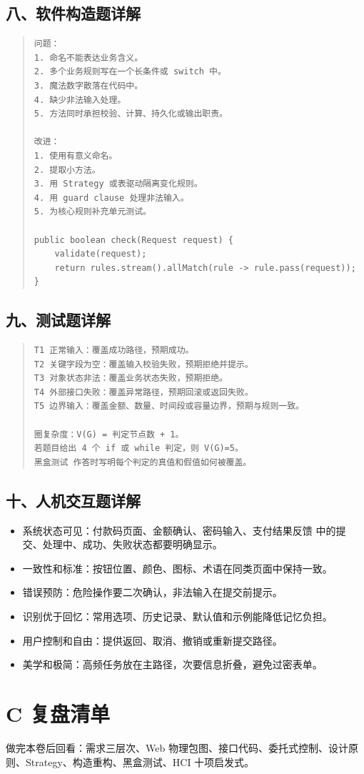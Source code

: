 \documentclass[UTF8,zihao=-4]{ctexart}
\begin{document}
\subsection{八、软件构造题详解}


\begin{quote}
\footnotesize
\begin{verbatim}
问题：
1. 命名不能表达业务含义。
2. 多个业务规则写在一个长条件或 switch 中。
3. 魔法数字散落在代码中。
4. 缺少非法输入处理。
5. 方法同时承担校验、计算、持久化或输出职责。

改进：
1. 使用有意义命名。
2. 提取小方法。
3. 用 Strategy 或表驱动隔离变化规则。
4. 用 guard clause 处理非法输入。
5. 为核心规则补充单元测试。

public boolean check(Request request) {
    validate(request);
    return rules.stream().allMatch(rule -> rule.pass(request));
}
\end{verbatim}
\end{quote}



\subsection{九、测试题详解}


\begin{quote}
\footnotesize
\begin{verbatim}
T1 正常输入：覆盖成功路径，预期成功。
T2 关键字段为空：覆盖输入校验失败，预期拒绝并提示。
T3 对象状态非法：覆盖业务状态失败，预期拒绝。
T4 外部接口失败：覆盖异常路径，预期回滚或返回失败。
T5 边界输入：覆盖金额、数量、时间段或容量边界，预期与规则一致。

圈复杂度：V(G) = 判定节点数 + 1。
若题目给出 4 个 if 或 while 判定，则 V(G)=5。
黑盒测试 作答时写明每个判定的真值和假值如何被覆盖。
\end{verbatim}
\end{quote}



\subsection{十、人机交互题详解}


\begin{itemize}
\item 系统状态可见：付款码页面、金额确认、密码输入、支付结果反馈 中的提交、处理中、成功、失败状态都要明确显示。
\item 一致性和标准：按钮位置、颜色、图标、术语在同类页面中保持一致。
\item 错误预防：危险操作要二次确认，非法输入在提交前提示。
\item 识别优于回忆：常用选项、历史记录、默认值和示例能降低记忆负担。
\item 用户控制和自由：提供返回、取消、撤销或重新提交路径。
\item 美学和极简：高频任务放在主路径，次要信息折叠，避免过密表单。
\end{itemize}



\section{C 复盘清单}


做完本卷后回看：需求三层次、Web 物理包图、接口代码、委托式控制、设计原则、Strategy、构造重构、黑盒测试、HCI 十项启发式。
\end{document}
